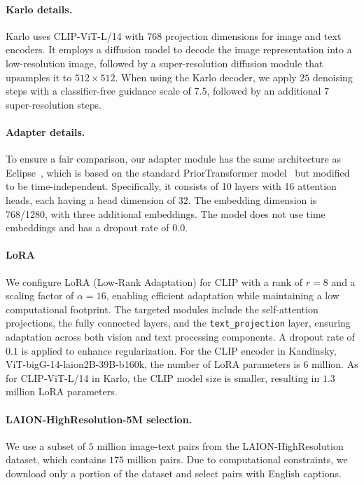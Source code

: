 \paragraph{Karlo details.} Karlo uses CLIP-ViT-L/14 with 768 projection dimensions for image and text encoders. It employs a diffusion model to decode the image representation into a low-resolution image, followed by a super-resolution diffusion module that upsamples it to $512\times 512$. When using the Karlo decoder, we apply $25$ denoising steps with a classifier-free guidance scale of 7.5, followed by an additional $7$ super-resolution steps.

\paragraph{Adapter details.} 
To ensure a fair comparison, our adapter module has the same architecture as Eclipse~\citep{patel2024eclipse}, which is based on the standard PriorTransformer model~\citep{ramesh2022hierarchical} but modified to be time-independent. Specifically, it consists of 10 layers with 16 attention heads, each having a head dimension of 32. The embedding dimension is 768/1280, with three additional embeddings. The model does not use time embeddings and has a dropout rate of 0.0.


\paragraph{LoRA} 
We configure LoRA (Low-Rank Adaptation) for CLIP with a rank of $r = 8$ and a scaling factor of $\alpha = 16$, enabling efficient adaptation while maintaining a low computational footprint. The targeted modules include the self-attention projections, the fully connected layers, and the \texttt{text\_projection} layer, ensuring adaptation across both vision and text processing components. A dropout rate of $0.1$ is applied to enhance regularization. 
For the CLIP encoder in Kandinsky, ViT-bigG-14-laion2B-39B-b160k, the number of LoRA parameters is $6$ million. As for CLIP-ViT-L/14 in Karlo, the CLIP model size is smaller, resulting in $1.3$ million LoRA parameters.


\paragraph{LAION-HighResolution-5M selection.} 
We use a subset of $5$ million image-text pairs from the LAION-HighResolution dataset, which contains $175$ million pairs. Due to computational constraints, we download only a portion of the dataset and select pairs with English captions.


